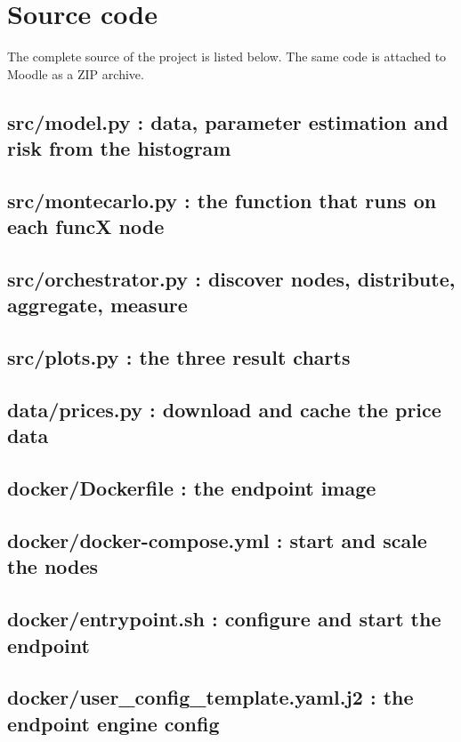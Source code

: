 \documentclass[11pt,a4paper]{article}
\begin{document}
\appendix
\section{Source code}

The complete source of the project is listed below. The same code is attached to Moodle as a ZIP archive.

\subsection{src/model.py : data, parameter estimation and risk from the histogram}


\subsection{src/montecarlo.py : the function that runs on each funcX node}


\subsection{src/orchestrator.py : discover nodes, distribute, aggregate, measure}


\subsection{src/plots.py : the three result charts}


\subsection{data/prices.py : download and cache the price data}


\subsection{docker/Dockerfile : the endpoint image}


\subsection{docker/docker-compose.yml : start and scale the nodes}


\subsection{docker/entrypoint.sh : configure and start the endpoint}


\subsection{docker/user\_config\_template.yaml.j2 : the endpoint engine config}

\end{document}
